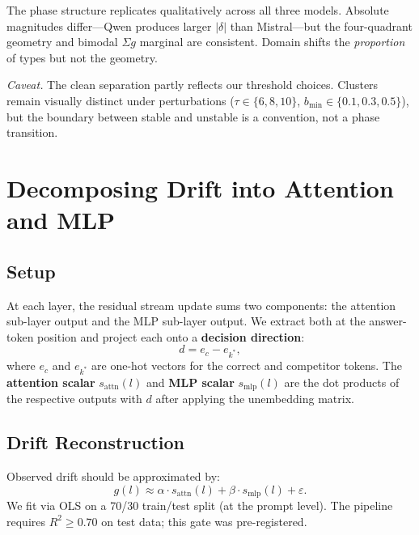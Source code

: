 \documentclass{article}
\begin{document}
The phase structure replicates qualitatively across all three models.  Absolute magnitudes differ---Qwen produces larger $|\delta|$ than Mistral---but the four-quadrant geometry and bimodal $\Sigma g$ marginal are consistent.  Domain shifts the \emph{proportion} of types but not the geometry.

\emph{Caveat.}  The clean separation partly reflects our threshold choices.  Clusters remain visually distinct under perturbations ($\tau \in \{6, 8, 10\}$, $b_{\min} \in \{0.1, 0.3, 0.5\}$), but the boundary between stable and unstable is a convention, not a phase transition.


\section{Decomposing Drift into Attention and MLP}
\label{sec:decomposition}

\subsection{Setup}

At each layer, the residual stream update sums two components: the attention sub-layer output and the MLP sub-layer output.  We extract both at the answer-token position and project each onto a \textbf{decision direction}:
\begin{equation}
  d = e_c - e_{k^*},
  \label{eq:direction}
\end{equation}
where $e_c$ and $e_{k^*}$ are one-hot vectors for the correct and competitor tokens.  The \textbf{attention scalar} $s_{\mathrm{attn}}(l)$ and \textbf{MLP scalar} $s_{\mathrm{mlp}}(l)$ are the dot products of the respective outputs with $d$ after applying the unembedding matrix.

\subsection{Drift Reconstruction}

Observed drift should be approximated by:
\begin{equation}
  g(l) \approx \alpha \cdot s_{\mathrm{attn}}(l) + \beta \cdot s_{\mathrm{mlp}}(l) + \varepsilon.
  \label{eq:decomposition}
\end{equation}
We fit via OLS on a 70/30 train/test split (at the prompt level).  The pipeline requires $R^2 \geq 0.70$ on test data; this gate was pre-registered.
\end{document}

